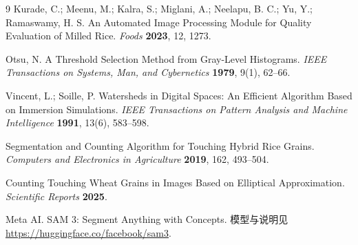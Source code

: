 \documentclass[12pt, a4paper]{ctexart}
\begin{document}
\begin{thebibliography}{9}
Kurade, C.; Meenu, M.; Kalra, S.; Miglani, A.; Neelapu, B. C.; Yu, Y.; Ramaswamy, H. S.
An Automated Image Processing Module for Quality Evaluation of Milled Rice.
\emph{Foods} \textbf{2023}, 12, 1273.

Otsu, N. A Threshold Selection Method from Gray-Level Histograms.
\emph{IEEE Transactions on Systems, Man, and Cybernetics} \textbf{1979}, 9(1), 62--66.

Vincent, L.; Soille, P. Watersheds in Digital Spaces: An Efficient Algorithm Based on
Immersion Simulations. \emph{IEEE Transactions on Pattern Analysis and Machine Intelligence}
\textbf{1991}, 13(6), 583--598.

Segmentation and Counting Algorithm for Touching Hybrid Rice Grains.
\emph{Computers and Electronics in Agriculture} \textbf{2019}, 162, 493--504.

Counting Touching Wheat Grains in Images Based on Elliptical Approximation.
\emph{Scientific Reports} \textbf{2025}.

Meta AI. SAM 3: Segment Anything with Concepts.
模型与说明见 \url{https://huggingface.co/facebook/sam3}.
\end{thebibliography}
\end{document}
